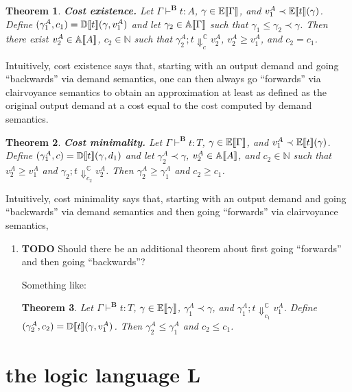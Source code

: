 \documentclass[11pt]{article}
\newcommand{\N}{\mathbb{N}}
\DeclarePairedDelimiter{\bbrackets}{\llbracket}{\rrbracket}
\newtheorem{theorem}{Theorem}
\newcommand{\LB}{\mathbf{B}}
\newcommand{\LL}{\mathbf{L}}
\newcommand{\BE}{\mathbb{E}}
\newcommand{\Eval}[1]{\BE\bbrackets{#1}}
\newcommand{\Approx}[1]{\mathbb{A}\bbrackets{#1}}
\newcommand{\BD}{\mathbb{D}}
\newcommand{\Demand}[1]{\BD\bbrackets{#1}}
\newcommand{\BC}{\mathbb{C}}
\newcommand{\CV}[4]{{{#1} \mathbin{;} {#2}} \Downarrow^\BC_{#3} {#4}}
\begin{document}
\begin{theorem}
\textbf{Cost existence.}  Let \(\Gamma \vdash^\LB t : A\), \(\gamma \in \Eval{\Gamma}\), and \(v^A_1 \prec \Eval{t}(\gamma)\).  Define \((\gamma^A_1, c_1) = \Demand{t}(\gamma, v^A_1)\) and let \(\gamma_2 \in \Approx{\Gamma}\) such that \(\gamma_1 \le \gamma_2 \prec \gamma\).  Then there exist \(v^A_2 \in \Approx{A}\), \(c_2 \in \N\) such that \(\CV{\gamma^A_2}{t}{c}{v^A_2}\), \(v_2^A \ge v_1^A\), and \(c_2 = c_1\).
\end{theorem}

Intuitively, cost existence says that, starting with an output demand and going “backwards” via demand semantics, one can then always go “forwards” via clairvoyance semantics to obtain an approximation at least as defined as the original output demand at a cost equal to the cost computed by demand semantics.

\begin{theorem}
\textbf{Cost minimality.}  Let \(\Gamma \vdash^\LB t : T\), \(\gamma \in \Eval{\Gamma}\), and \(v^A_1 \prec \Eval{t}(\gamma)\).  Define \((\gamma^A_1, c) = \Demand{t}(\gamma, d_1)\) and let \(\gamma^A_2 \prec \gamma\), \(v^A_2 \in \Approx{A}\), and \(c_2 \in \N\) such that \(v_2^A \ge v_1^A\) and \(\CV{\gamma_2}{t}{c_2}{v^A_2}\).  Then \(\gamma^A_2 \ge \gamma^A_1\) and \(c_2 \ge c_1\).
\end{theorem}

Intuitively, cost minimality says that, starting with an output demand and going “backwards” via demand semantics and then going “forwards” via clairvoyance semantics,
\begin{enumerate}
\item {\bfseries\sffamily TODO} Should there be an additional theorem about first going “forwards” and then going “backwards”?
\label{sec:org44b275f}

Something like:

\begin{theorem}
Let \(\Gamma \vdash^\LB t : T\), \(\gamma \in \Eval{\gamma}\), \(\gamma^A_1 \prec \gamma\), and \(\CV{\gamma^A_1}{t}{c_1}{v^A_1}\).  Define \((\gamma^A_2, c_2) = \Demand{t}(\gamma, v^A_1)\).  Then \(\gamma^A_2 \le \gamma^A_1\) and \(c_2 \le c_1\).
\end{theorem}
\end{enumerate}
\section{the logic language \(\LL\)}
\label{sec:org73f8131}
\end{document}
